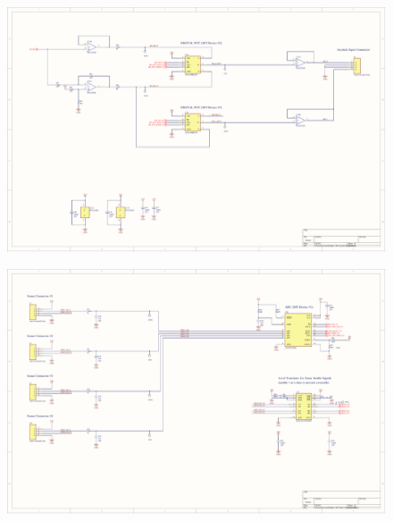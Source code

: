 \documentclass[oneside,final,a4paper]{report}
\begin{document}
\begin{figure}[hbt]
 \centering
 \includegraphics[scale=0.4, angle=270]{FYDP_Schematic_Sheet_4}
\end{figure}
\begin{figure}[hbt]
 \centering
 \includegraphics[scale=0.4, angle=270]{FYDP_Schematic_Sheet_5}
\end{figure}
\end{document}
